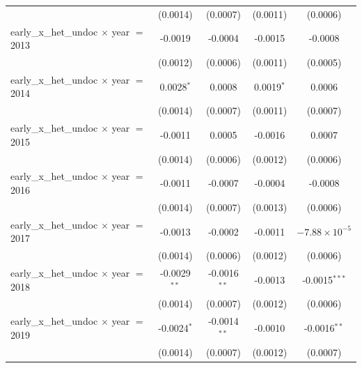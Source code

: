 \begin{tabular}{lcccc}
                                                   & (0.0014)           & (0.0007)                  & (0.0011)               & (0.0006)\\   
   early\_x\_het\_undoc $\times$ year $=$ 2013     & -0.0019            & -0.0004                   & -0.0015                & -0.0008\\   
                                                   & (0.0012)           & (0.0006)                  & (0.0011)               & (0.0005)\\   
   early\_x\_het\_undoc $\times$ year $=$ 2014     & 0.0028$^{*}$       & 0.0008                    & 0.0019$^{*}$           & 0.0006\\   
                                                   & (0.0014)           & (0.0007)                  & (0.0011)               & (0.0007)\\   
   early\_x\_het\_undoc $\times$ year $=$ 2015     & -0.0011            & 0.0005                    & -0.0016                & 0.0007\\   
                                                   & (0.0014)           & (0.0006)                  & (0.0012)               & (0.0006)\\   
   early\_x\_het\_undoc $\times$ year $=$ 2016     & -0.0011            & -0.0007                   & -0.0004                & -0.0008\\   
                                                   & (0.0014)           & (0.0007)                  & (0.0013)               & (0.0006)\\   
   early\_x\_het\_undoc $\times$ year $=$ 2017     & -0.0013            & -0.0002                   & -0.0011                & $-7.88\times 10^{-5}$\\    
                                                   & (0.0014)           & (0.0006)                  & (0.0012)               & (0.0006)\\   
   early\_x\_het\_undoc $\times$ year $=$ 2018     & -0.0029$^{**}$     & -0.0016$^{**}$            & -0.0013                & -0.0015$^{***}$\\   
                                                   & (0.0014)           & (0.0007)                  & (0.0012)               & (0.0006)\\   
   early\_x\_het\_undoc $\times$ year $=$ 2019     & -0.0024$^{*}$      & -0.0014$^{**}$            & -0.0010                & -0.0016$^{**}$\\   
                                                   & (0.0014)           & (0.0007)                  & (0.0012)               & (0.0007)\\   

\end{tabular}
